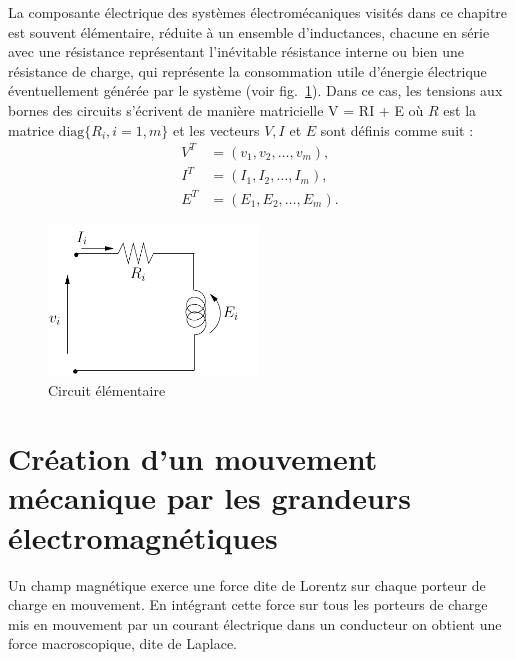 La composante électrique des systèmes électromécaniques visités dans ce chapitre est souvent élémentaire, réduite à un ensemble d'inductances, chacune en série avec une résistance représentant l'inévitable résistance interne ou bien une résistance de charge, qui représente la consommation utile d'énergie électrique éventuellement générée par le système (voir fig.~\ref{fig:circel}). Dans ce cas, les tensions aux bornes des circuits s'écrivent de manière matricielle
\eqn
V = RI + E \label{ELECM}
\eeqn
où $R$ est la matrice $\mbox{diag}\{R_i, i = 1,m\}$ et les
vecteurs $V,I$ et $E$ sont définis comme suit :
\begin{equation*} \begin{split}
V^T &= (v_1, v_2, \ldots, v_m),\\
I^T &= (I_1, I_2, \ldots, I_m),\\
E^T &= (E_1, E_2, \ldots, E_m).
\end{split} \end{equation*}
\begin{figure}[t]
\begin{center}
\includegraphics[height=4cm]{circel}
\caption{Circuit élémentaire}
\label{fig:circel}
\end{center}
\end{figure}



\section{Création d'un mouvement mécanique par les grandeurs électromagnétiques} 

Un champ magnétique exerce une force dite de Lorentz sur chaque porteur de charge en mouvement. En intégrant cette force sur tous les porteurs de charge mis en mouvement par un courant électrique dans un conducteur on obtient une force macroscopique, dite de Laplace.  


